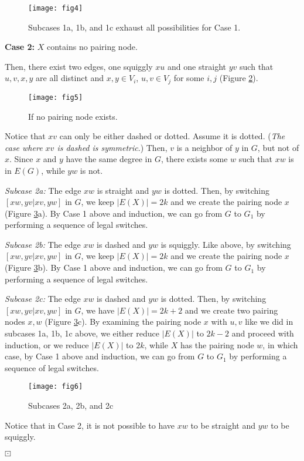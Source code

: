 \documentclass[12pt,a4paper]{article}
\theoremstyle{definition}
\theoremstyle{plain}
\newenvironment{prf}{\noindent {\bf Proof.}}{\begin{flushright}\vspace{-2em}\footnotesize$\boxdot$\normalsize\end{flushright}\smallskip}
\begin{document}
\begin{prf}
\begin{figure}[h]
\centering
\texttt{[image: fig4]}
\caption{Subcases 1a, 1b, and 1c exhaust all possibilities for Case 1.}
\label{fig4}
\end{figure}

\noindent\textbf{Case 2:} $X$ contains no pairing node. 

\noindent Then, there exist two edges, one squiggly $xu$ and one straight $yv$ such 
that $u,v,x,y$ are all distinct and $x,y\in V_i$, $u,v\in V_j$ for some $i,j$ (Figure \ref{fig5}).
\begin{figure}[h]
\centering
\texttt{[image: fig5]}
\caption{If no pairing node exists.}
\label{fig5}
\end{figure}
Notice that $xv$ can only be either dashed or dotted. Assume it is dotted. (\emph{The case 
where $xv$ is dashed is symmetric}.) Then, $v$ is a neighbor of $y$ in $G$, but not 
of $x$. Since $x$ and $y$ have the same degree in $G$, there exists some $w$ such that 
$xw$ is in $E(G)$, while $yw$ is not.

\noindent\emph{Subcase 2a:} The edge $xw$ is straight and $yw$ is dotted. Then, by 
switching $[xw,yv|xv,yw]$ in $G$, we keep $|E(X)|= 2k$ and we create the pairing node 
$x$ (Figure \ref{fig6}a). By Case 1 above and induction, we can go from $G$ to $G_1$ by 
performing a sequence of legal switches.

\noindent\emph{Subcase 2b:} The edge $xw$ is dashed and $yw$ is squiggly. Like above, 
by switching $[xw,yv|xv,yw]$ in $G$, we keep $|E(X)|= 2k$ and we create the pairing 
node $x$ (Figure \ref{fig6}b). By Case 1 above and induction, we can go from $G$ to $G_1$ by 
performing a sequence of legal switches.

\noindent\emph{Subcase 2c:} The edge $xw$ is dashed and $yw$ is dotted. Then, by 
switching $[xw,yv|xv,yw]$ in $G$, we have $|E(X)|= 2k+2$ and we create two pairing nodes 
$x,w$ (Figure \ref{fig6}c). By examining the pairing node $x$ with $u,v$ like we did in subcases 1a, 
1b, 1c above, we either reduce $|E(X)|$ to $2k-2$ and proceed with induction, or we
reduce $|E(X)|$ to $2k$, while $X$ has the pairing node $w$, in which case, by Case 1 
above and induction, we can go from $G$ to $G_1$ by performing a sequence of legal switches.

\begin{figure}[h]
\centering
\texttt{[image: fig6]}
\caption{Subcases 2a, 2b, and 2c}
\label{fig6}
\end{figure}

Notice that in Case 2, it is not possible to have $xw$ to be straight and $yw$ to be
squiggly.\\

\end{prf}
\end{document}
